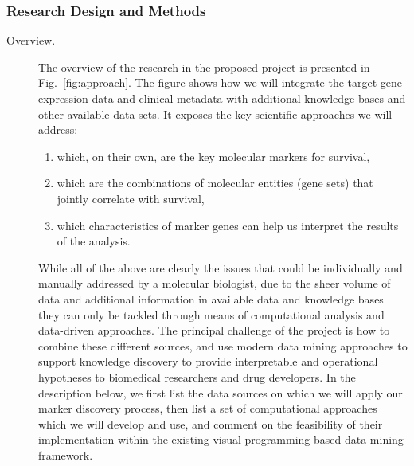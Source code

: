 \documentclass[11pt,a4paper]{article}
\begin{document}
\subsubsection{Research Design and Methods}
\begin{description}
	\item[Overview.] 
The overview of the research in the proposed project is presented in Fig.~\ref{fig:approach}. The figure shows how we will integrate the target gene expression data and clinical metadata with additional knowledge bases and other available data sets. It exposes the key scientific approaches we will address:
\begin{enumerate}
\item which, on their own, are the key molecular markers for survival,
\item which are the combinations of molecular entities (gene sets) that jointly correlate with survival,
\item which characteristics of marker genes can help us interpret the results of the analysis.
\end{enumerate}
While all of the above are clearly the issues that could be individually and manually addressed by a molecular biologist, due to the sheer volume of data and additional information in available data and knowledge bases they can only be tackled through means of computational analysis and data-driven approaches. The principal challenge of the project is how to combine these different sources, and use modern data mining approaches to support knowledge discovery to provide interpretable and operational hypotheses to biomedical researchers and drug developers. In the description below, we first list the data sources on which we will apply our marker discovery process, then list a set of computational approaches which we will develop and use, and comment on the feasibility of their implementation within the existing visual programming-based data mining framework.


\end{description}
\end{document}
